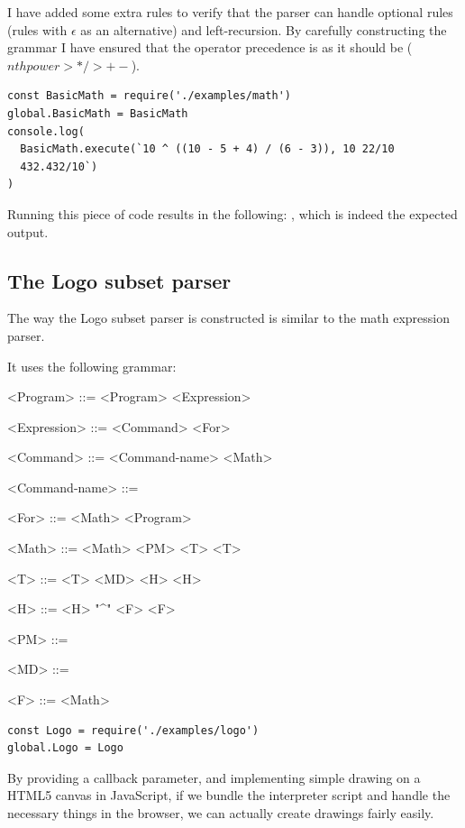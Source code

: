 I have added some extra rules to verify that the parser can handle optional rules (rules with $\epsilon$ as an alternative) and left-recursion. By carefully constructing the grammar I have ensured that the operator precedence is as it should be ($nth power > */ > +-$).

\begin{lstlisting}[frame=single]
const BasicMath = require('./examples/math')
global.BasicMath = BasicMath
console.log(
  BasicMath.execute(`10 ^ ((10 - 5 + 4) / (6 - 3)), 10 22/10
  432.432/10`)
)
\end{lstlisting}

Running this piece of code results in the following: , which is indeed the expected output.

\subsection{The Logo subset parser}
The way the Logo subset parser is constructed is similar to the math expression parser. 

It uses the following grammar:
\begin{grammar}

<Program> ::= <Program> <Expression> \alt \lit{}

<Expression> ::= <Command> \alt <For>

<Command> ::= <Command-name> <Math>

<Command-name> ::=  \alt {} \alt {} \alt {} 

<For> ::=  <Math> \lit{[} <Program> \lit{]}

<Math> ::= <Math> <PM> <T> \alt <T>

<T> ::= <T> <MD> <H> \alt <H>

<H> ::= <H> "^" <F> \alt <F>

<PM> ::= \lit{+} \alt \lit{-}

<MD> ::= \lit{*} \alt \lit{/}

<F> ::= \lit{(} <Math> \lit{)}  

\end{grammar}

\begin{lstlisting}[frame=single]
const Logo = require('./examples/logo')
global.Logo = Logo
\end{lstlisting}

By providing a callback parameter, and implementing simple drawing on a HTML5 canvas in JavaScript, if we bundle the interpreter script and handle the necessary things in the browser, we can actually create drawings fairly easily.

